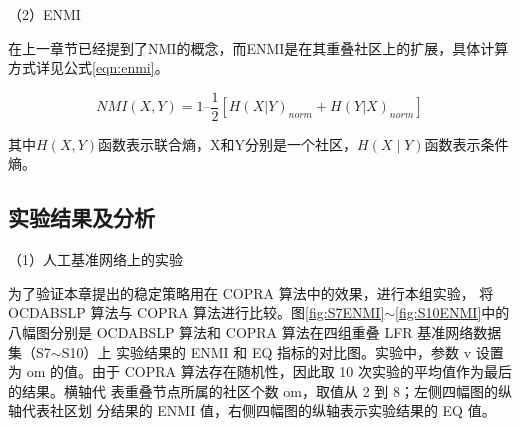 （2）ENMI

在上一章节已经提到了NMI的概念，而ENMI\cite{Lancichinetti2009Detecting}是在其重叠社区上的扩展，具体计算方式详见公式\ref{eqn:enmi}。

\begin{equation}
  \label{eqn:enmi}
  NMI(X,Y) = 1 – \frac{1}{2} [H(X|Y)_{norm} + H(Y|X)_{norm}]
\end{equation}

其中$H(X,Y)$函数表示联合熵，X和Y分别是一个社区，$H(X \mid Y)$函数表示条件熵。

\subsection{实验结果及分析}

（1）人工基准网络上的实验

为了验证本章提出的稳定策略用在 COPRA 算法中的效果，进行本组实验，
将 OCDABSLP 算法与 COPRA 算法进行比较。图\ref{fig:S7ENMI}$\sim$\ref{fig:S10ENMI}中的八幅图分别是
OCDABSLP 算法和 COPRA 算法在四组重叠 LFR 基准网络数据集（S7$\sim$S10）上
实验结果的 ENMI 和 EQ 指标的对比图。实验中，参数 v 设置为 om 的值。由于
COPRA 算法存在随机性，因此取 10 次实验的平均值作为最后的结果。横轴代
表重叠节点所属的社区个数 om，取值从 2 到 8；左侧四幅图的纵轴代表社区划
分结果的 ENMI 值，右侧四幅图的纵轴表示实验结果的 EQ 值。 

